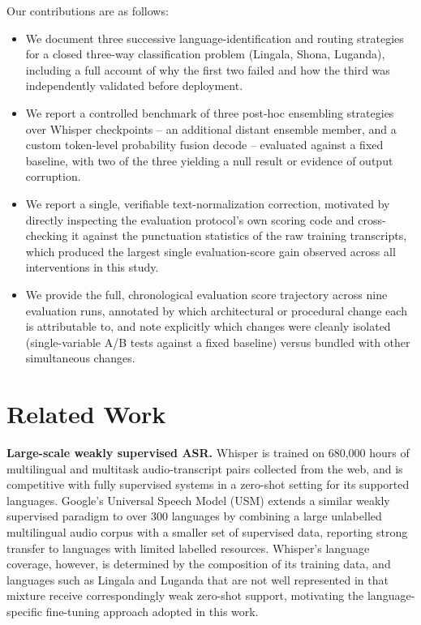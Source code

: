 \documentclass[11pt]{article}
\begin{document}
Our contributions are as follows:
\begin{itemize}
\item We document three successive language-identification and routing strategies for a closed three-way classification problem (Lingala, Shona, Luganda), including a full account of why the first two failed and how the third was independently validated before deployment.
\item We report a controlled benchmark of three post-hoc ensembling strategies over Whisper checkpoints -- an additional distant ensemble member, and a custom token-level probability fusion decode -- evaluated against a fixed baseline, with two of the three yielding a null result or evidence of output corruption.
\item We report a single, verifiable text-normalization correction, motivated by directly inspecting the evaluation protocol's own scoring code and cross-checking it against the punctuation statistics of the raw training transcripts, which produced the largest single evaluation-score gain observed across all interventions in this study.
\item We provide the full, chronological evaluation score trajectory across nine evaluation runs, annotated by which architectural or procedural change each is attributable to, and note explicitly which changes were cleanly isolated (single-variable A/B tests against a fixed baseline) versus bundled with other simultaneous changes.
\end{itemize}

\section{Related Work}

\textbf{Large-scale weakly supervised ASR.} Whisper \cite{radford2023whisper} is trained on 680{,}000 hours of multilingual and multitask audio-transcript pairs collected from the web, and is competitive with fully supervised systems in a zero-shot setting for its supported languages. Google's Universal Speech Model (USM) \cite{zhang2023usm} extends a similar weakly supervised paradigm to over 300 languages by combining a large unlabelled multilingual audio corpus with a smaller set of supervised data, reporting strong transfer to languages with limited labelled resources. Whisper's language coverage, however, is determined by the composition of its training data, and languages such as Lingala and Luganda that are not well represented in that mixture receive correspondingly weak zero-shot support, motivating the language-specific fine-tuning approach adopted in this work.
\end{document}
